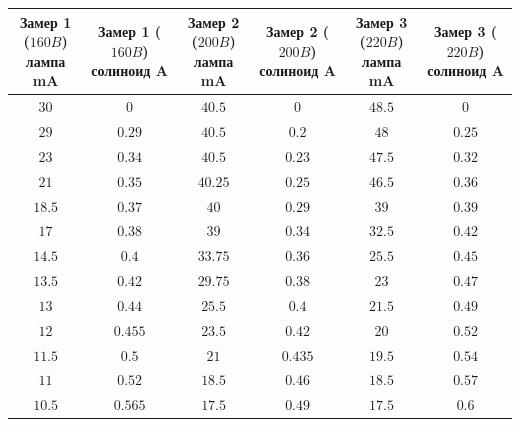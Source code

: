 \begin{table}[!h]
    \centering
    \begin{tabular}{|c|c|c|c|c|c|}
         \hline
         \makecell{Замер 1\\($160B$)\\лампа\\mA} &
         \makecell{Замер 1\\($160B$)\\солиноид\\A}&
         \makecell{Замер 2\\($200B$)\\лампа\\mA} &
         \makecell{Замер 2\\($200B$)\\солиноид\\A}&
         \makecell{Замер 3\\($220B$)\\лампа\\mA} &
         \makecell{Замер 3\\($220B$)\\солиноид\\A}\\
         \hline
         $30$& $0$& $40.5$& $0$& $48.5$& $0$\\
         \hline
         $29$& $0.29$& $40.5$& $0.2$& $48$& $0.25$\\
         \hline
         $23$& $0.34$& $40.5$& $0.23$& $47.5$& $0.32$\\
         \hline
         $21$& $0.35$& $40.25$& $0.25$& $46.5$& $0.36$\\
         \hline
         $18.5$& $0.37$& $40$& $0.29$& $39$& $0.39$\\
         \hline
         $17$& $0.38$& $39$& $0.34$& $32.5$& $0.42$\\
         \hline
         $14.5$& $0.4$& $33.75$& $0.36$& $25.5$& $0.45$\\
         \hline
         $13.5$& $0.42$& $29.75$& $0.38$& $23$& $0.47$\\
         \hline
         $13$& $0.44$& $25.5$& $0.4$& $21.5$& $0.49$\\
         \hline
         $12$& $0.455$& $23.5$& $0.42$& $20$& $0.52$\\
         \hline
         $11.5$& $0.5$& $21$& $0.435$& $19.5$& $0.54$\\
         \hline
         $11$& $0.52$& $18.5$& $0.46$& $18.5$& $0.57$\\
         \hline
         $10.5$& $0.565$& $17.5$& $0.49$& $17.5$& $0.6$\\

\end{tabular}
\end{table}
